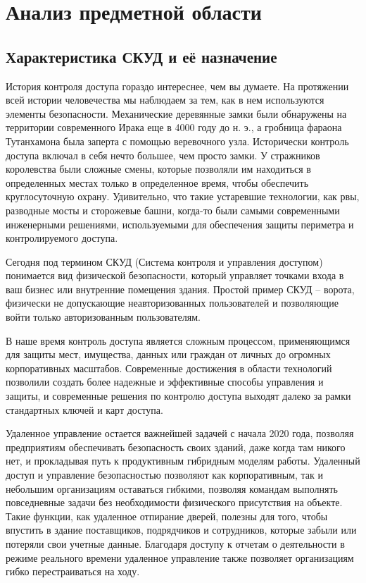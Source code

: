 \section{Анализ предметной области}
\subsection{Характеристика СКУД и её назначение}

История контроля доступа гораздо интереснее, чем вы думаете. На протяжении всей истории человечества мы наблюдаем за тем, как в нем используются элементы безопасности. Механические деревянные замки были обнаружены на территории современного Ирака еще в 4000 году до н. э., а гробница фараона Тутанхамона была заперта с помощью веревочного узла. Исторически контроль доступа включал в себя нечто большее, чем просто замки. У стражников королевства были сложные смены, которые позволяли им находиться в определенных местах только в определенное время, чтобы обеспечить круглосуточную охрану. Удивительно, что такие устаревшие технологии, как рвы, разводные мосты и сторожевые башни, когда-то были самыми современными инженерными решениями, используемыми для обеспечения защиты периметра и контролируемого доступа.

Сегодня под термином СКУД (Система контроля и управления доступом) понимается вид физической безопасности, который управляет точками входа в ваш бизнес или внутренние помещения здания. Простой пример СКУД -- ворота, физически не допускающие неавторизованных пользователей и позволяющие войти только авторизованным пользователям.

В наше время контроль доступа является сложным процессом, применяющимся для защиты мест, имущества, данных или граждан от личных до огромных корпоративных масштабов.  Современные достижения в области технологий позволили создать более надежные и эффективные способы управления и защиты, и современные решения по контролю доступа выходят далеко за рамки стандартных ключей и карт доступа. 

Удаленное управление остается важнейшей задачей с начала 2020 года, позволяя предприятиям обеспечивать безопасность своих зданий, даже когда там никого нет, и прокладывая путь к продуктивным гибридным моделям работы. Удаленный доступ и управление безопасностью позволяют как корпоративным, так и небольшим организациям оставаться гибкими, позволяя командам выполнять повседневные задачи без необходимости физического присутствия на объекте. Такие функции, как удаленное отпирание дверей, полезны для того, чтобы впустить в здание поставщиков, подрядчиков и сотрудников, которые забыли или потеряли свои учетные данные. Благодаря доступу к отчетам о деятельности в режиме реального времени удаленное управление также позволяет организациям гибко перестраиваться на ходу. 


